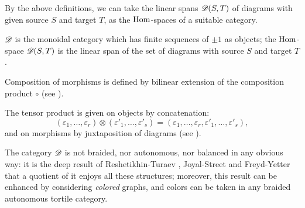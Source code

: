By the above definitions, we can take the linear spans $\mathscr{D}_{}(S,T)$ of
diagrams with given source $S$ and target $T$, as the $\operatorname{Hom}$-spaces of a
suitable category.
\begin{definition}
\label{dfn:diagrams-category}
$\mathscr{D}_{}$ is the monoidal category which has finite sequences of $\pm1$ as
objects; the $\operatorname{Hom}$-space $\mathscr{D}_{}(S,T)$ is the linear span of the set of
diagrams with source $S$ and target $T$.

Composition of morphisms is defined by bilinear extension of the
composition product $\circ$ (see ).

The tensor product is given on objects by concatenation:
\begin{equation*}
  (\varepsilon_1, \ldots, \varepsilon_r) \otimes (\varepsilon'_1, \ldots, \varepsilon'_s) = (\varepsilon_1, \ldots, \varepsilon_r, \varepsilon'_1, \ldots, \varepsilon'_s),
\end{equation*}
and on morphisms by juxtaposition of diagrams (see
). 
\end{definition}

The category $\mathscr{D}_{}$ is not braided, nor autonomous, nor balanced in
any obvious way: it is the deep result of Reshetikhin-Turaev
\cite{reshetikhin-turaev;ribbon-graphs}, Joyal-Street
\cite{joyal-street;tensor-calculus} and Freyd-Yetter
\cite{freyd-yetter;btc} that a quotient of it enjoys all these
structures; moreover, this result can be enhanced by considering
\emph{colored} graphs, and colors can be taken in any braided
autonomous tortile category.


